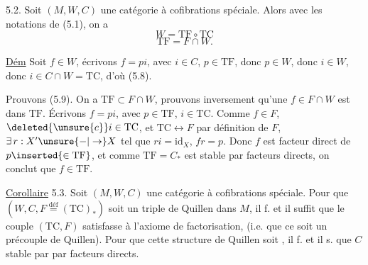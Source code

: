 
\uline{} 5.2. Soit $(M,W,C)$ une catégorie à cofibrations spéciale.  Alors avec les notations de (5.1), on a
\[
 W=\mathrm{TF}\circ\mathrm{TC} \tag*{(5.8)}
\]
\[
 \mathrm{TF}=F\cap W. \tag*{(5.9)}
\]

\uline{Dém} Soit $f\in W$, écrivons $f=pi$, avec $i\in C$, $p\in\mathrm{TF}$, donc $p\in W$, donc $i\in W$, donc $i\in C\cap W=\mathrm{TC}$, d'où (5.8).

Prouvons (5.9). On a $\mathrm{TF}\subset F\cap W$, prouvons inversement qu'une $f\in F\cap W$ est dans $\mathrm{TF}$.
Écrivons $f=pi$, avec $p\in\mathrm{TF}$, $i\in\mathrm{TC}$. Comme $f\in F$, $\deleted{\unsure{c}}i\in\mathrm{TC}$, et $\mathrm{TC}\longleftrightarrow F$ par définition de $F$, $\exists\,r:X'\unsure{\mathbin{-}|\to}X$ tel que $ri=\mathrm{id}_X$, $fr=p$. Donc $f$ est facteur direct de $p\inserted{\in\mathrm{TF}}$, et comme $\mathrm{TF}=C_*$  est stable par facteurs directs, on conclut que $f\in\mathrm{TF}$.

\uline{Corollaire} 5.3. Soit $(M,W,C)$ une catégorie à cofibrations spéciale. Pour que $(W,C,F\overset{\mathrm{déf}}{=}(\mathrm{TC})_*)$ soit un triple de Quillen dans $M$, il f. et il suffit que  le couple $(\mathrm{TC},F)$ satisfasse à l'axiome de factorisation, (i.e. que ce soit un précouple de Quillen). Pour que cette structure de Quillen soit , il f. et il s. que $C$   stable par par facteurs directs.
